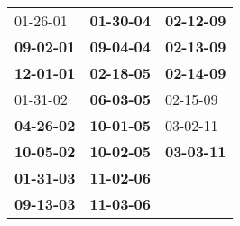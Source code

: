 \begin{supertabular}{p{0.33\columnwidth}p{0.33\columnwidth}p{0.33\columnwidth}}
          01-26-01\textsuperscript{} &  \textbf{01-30-04\textsuperscript{}} &  \textbf{02-12-09\textsuperscript{}} \\
 \textbf{09-02-01\textsuperscript{}} &  \textbf{09-04-04\textsuperscript{}} &  \textbf{02-13-09\textsuperscript{}} \\
 \textbf{12-01-01\textsuperscript{}} &  \textbf{02-18-05\textsuperscript{}} &  \textbf{02-14-09\textsuperscript{}} \\
          01-31-02\textsuperscript{} &  \textbf{06-03-05\textsuperscript{}} &           02-15-09\textsuperscript{} \\
 \textbf{04-26-02\textsuperscript{}} &  \textbf{10-01-05\textsuperscript{}} &           03-02-11\textsuperscript{} \\
 \textbf{10-05-02\textsuperscript{}} &  \textbf{10-02-05\textsuperscript{}} &  \textbf{03-03-11\textsuperscript{}} \\
 \textbf{01-31-03\textsuperscript{}} &  \textbf{11-02-06\textsuperscript{}} &                                      \\
 \textbf{09-13-03\textsuperscript{}} &  \textbf{11-03-06\textsuperscript{}} &                                      \\
\end{supertabular}
